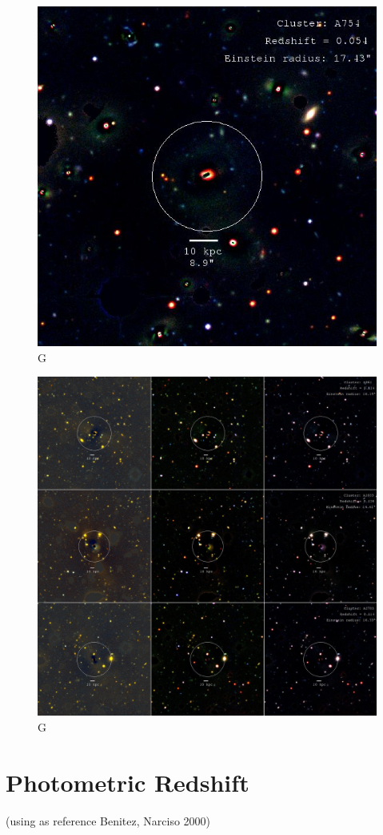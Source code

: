 \begin{figure}[H]
\centering
\includegraphics[width=12cm]{images/cA754_galfit.jpg}
\caption[M]{G}
\end{figure}


\begin{figure}[H]
\centering
\includegraphics[width=15cm]{images/full.jpg}
\caption[M]{G}
\end{figure}

\section{Photometric Redshift}

(using as reference Benitez, Narciso 2000)